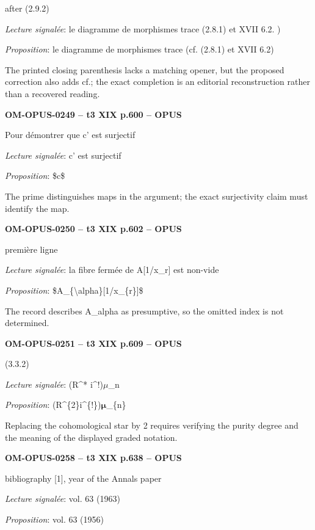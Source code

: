 after (2.9.2)\par
\emph{Lecture signalée}: le diagramme de morphismes trace (2.8.1) et XVII 6.2. )\par
\emph{Proposition}: le diagramme de morphismes trace (cf. (2.8.1) et XVII 6.2)\par
The printed closing parenthesis lacks a matching opener, but the proposed correction also adds cf.; the exact completion is an editorial reconstruction rather than a recovered reading.\par
\par\noindent\textbf{OM-OPUS-0249 -- t3 XIX p.600 -- OPUS}\par
Pour démontrer que c' est surjectif\par
\emph{Lecture signalée}: c' est surjectif\par
\emph{Proposition}: \$c\$\par
The prime distinguishes maps in the argument; the exact surjectivity claim must identify the map.\par
\par\noindent\textbf{OM-OPUS-0250 -- t3 XIX p.602 -- OPUS}\par
première ligne\par
\emph{Lecture signalée}: la fibre fermée de A[1/x\_r] est non-vide\par
\emph{Proposition}: \$A\_\{\textbackslash{}alpha\}[1/x\_\{r\}]\$\par
The record describes A\_alpha as presumptive, so the omitted index is not determined.\par
\par\noindent\textbf{OM-OPUS-0251 -- t3 XIX p.609 -- OPUS}\par
(3.3.2)\par
\emph{Lecture signalée}: (R\textasciicircum{}* i\textasciicircum{}!)\ensuremath{\mu}\_n\par
\emph{Proposition}: (R\textasciicircum{}\{2\}i\textasciicircum{}\{!\})\ensuremath{𝛍}\_\{n\}\par
Replacing the cohomological star by 2 requires verifying the purity degree and the meaning of the displayed graded notation.\par
\par\noindent\textbf{OM-OPUS-0258 -- t3 XIX p.638 -- OPUS}\par
bibliography [1], year of the Annals paper\par
\emph{Lecture signalée}: vol. 63 (1963)\par
\emph{Proposition}: vol. 63 (1956)\par
